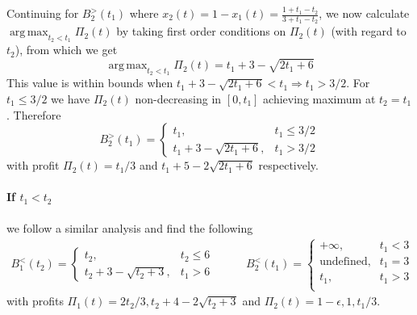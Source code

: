 \documentclass[10pt,a4paper]{book}
\DeclareMathOperator*{\argmax}{arg\,max}
\theoremstyle{definition}
\theoremstyle{comment}
\begin{document}
Continuing for $B_2^>(t_1)$ where $x_2(t) = 1 - x_1(t) = \frac{1 + t_1 - t_2}{3 + t_1 - t_2}$, we now calculate $\argmax_{t_2 < t_1} \Pi_2(t)$ by taking first order conditions on $\Pi_2(t)$ (with regard to $t_2$), from which we get
\[\argmax_{t_2 < t_1} \Pi_2(t) = t_1 + 3 - \sqrt{2 t_1 + 6}\]
This value is within bounds when $t_1 + 3 - \sqrt{2 t_1 + 6} < t_1 \Rightarrow t_1 > 3/2$.
For $t_1 \le 3/2$ we have $\Pi_2(t)$ non-decreasing in $[0, t_1]$ achieving maximum at $t_2 = t_1$.
Therefore
\[
	B_2^>(t_1) =
		\begin{cases}
			t_1, & t_1 \le 3/2 \\
			t_1 + 3 - \sqrt{2 t_1 + 6}, & t_1 > 3/2
		\end{cases}
\]
with profit $\Pi_2(t) = t_1/3$ and $t_1 + 5 - 2 \sqrt{2 t_1 + 6}$ respectively.

\paragraph{If $t_1 < t_2$}
we follow a similar analysis and find the following
\begin{equation*}
	\begin{aligned}
		B_1^<(t_2) =
			\begin{cases}
				t_2, & t_2 \le 6 \\
				t_2 + 3 - \sqrt{t_2 + 3}, & t_1 > 6
			\end{cases}
	\end{aligned}
	\qquad
	\begin{aligned}
		B_2^<(t_1) =
			\begin{cases}
				+\infty, & t_1 < 3 \\
				\textrm{undefined}, & t_1 = 3 \\
				t_1, & t_1 > 3 \\
			\end{cases}
	\end{aligned}
\end{equation*}
with profits $\Pi_1(t) = {2 t_2}/3, t_2 + 4 - 2 \sqrt{t_2 + 3}$ and $\Pi_2(t) = 1 - \epsilon, 1, t_1/3$.
\end{document}
